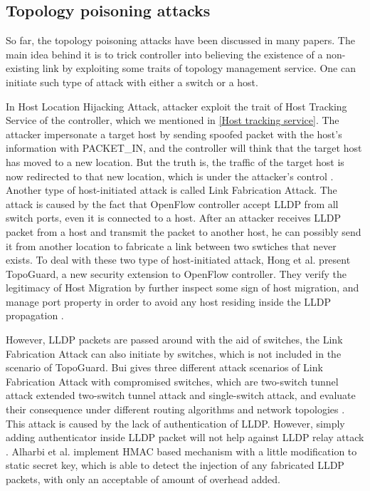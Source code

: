 \subsection{Topology poisoning attacks}
So far, the topology poisoning attacks have been discussed in many papers. The main idea behind it is to trick controller into believing the existence of a non-existing link by exploiting some traits of topology management service. One can initiate such type of attack with either a switch or a host.

In Host Location Hijacking Attack, attacker exploit the trait of Host Tracking Service of the controller, which we mentioned in \ref{Host tracking service}. The attacker impersonate a target host by sending spoofed packet with the host's information with PACKET\_IN, and the controller will think that the target host has moved to a new location. But the truth is, the traffic of the target host is now redirected to that new location, which is under the attacker's control \cite{HXWG15}. Another type of host-initiated attack is called Link Fabrication Attack. The attack is caused by the fact that OpenFlow controller accept LLDP from all switch ports, even it is connected to a host. After an attacker receives LLDP packet from a host and transmit the packet to another host, he can possibly send it from another location to fabricate a link between two swtiches that never exists. To deal with these two type of host-initiated attack, Hong et al. present TopoGuard, a new security extension to OpenFlow controller. They verify the legitimacy of Host Migration by further inspect some sign of host migration, and manage port property in order to avoid any host residing inside the LLDP propagation \cite{HXWG15}. 

However, LLDP packets are passed around with the aid of switches, the Link Fabrication Attack can also initiate by switches, which is not included in the scenario of TopoGuard. Bui gives three different attack scenarios of Link Fabrication Attack with compromised switches, which are two-switch tunnel attack extended two-switch tunnel attack and single-switch attack, and evaluate their consequence under different routing algorithms and network topologies \cite{TTB15}. This attack is caused by the lack of authentication of LLDP. However, simply adding authenticator inside LLDP packet will not help against LLDP relay attack \cite{HXWG15}. Alharbi et al. implement HMAC based mechanism with a little modification to static secret key, which is able to detect the injection of any fabricated LLDP packets, with only an acceptable of amount of overhead added.
\cite{ATPP15}


